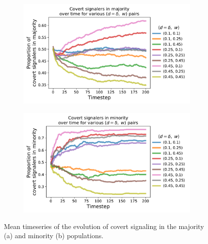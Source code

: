 \documentclass[11pt,letterpaper]{article}
\begin{document}
\begin{figure}[H]
  \centering
  \begin{subfigure}{0.49\textwidth}
    \centering
    \includegraphics[width=\textwidth]{prelim/Figures/covert_series_majority_005.pdf}
    \caption{}
    \label{fig:}
  \end{subfigure}
  \begin{subfigure}{0.49\textwidth}
    \centering
    \includegraphics[width=\textwidth]{prelim/Figures/covert_series_minority_005.pdf}
    \caption{}
    \label{fig:}
  \end{subfigure}
  \caption{Mean timeseries of the evolution of covert signaling in the
    majority (a) and minority (b) populations.}
  \label{fig:regressions}
\end{figure}
\end{document}
